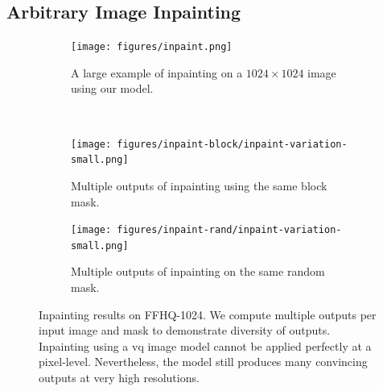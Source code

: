 
\subsection{Arbitrary Image Inpainting}
\label{subsec:evaluationInpainting}

\begin{figure}[h]
    \centering
    \begin{subfigure}[b]{\textwidth}
        \centering
        \label{fig:inpaintExample}
        \texttt{[image: figures/inpaint.png]}
        \caption{A large example of inpainting on a $1024 \times 1024$ image using our
        model.}
    \end{subfigure}
    \\
    \begin{subfigure}[b]{0.47\textwidth}
        \centering
        \texttt{[image: figures/inpaint-block/inpaint-variation-small.png]}
        \caption{
            Multiple outputs of inpainting using the same block mask.
        }
    \end{subfigure}
    \hfill
    \begin{subfigure}[b]{0.47\textwidth}
        \centering
        \texttt{[image: figures/inpaint-rand/inpaint-variation-small.png]}
        \caption{
            Multiple outputs of inpainting on the same random mask. 
        }
    \end{subfigure}
    \caption{
        Inpainting results on FFHQ-1024. We compute multiple outputs per
        input image and mask to demonstrate diversity of outputs. Inpainting
        using a \gls{vq} image model cannot be applied perfectly at a
        pixel-level. Nevertheless, the model still produces many convincing
        outputs at very high resolutions.
    }
\end{figure}

